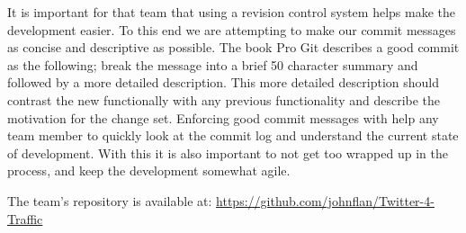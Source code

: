 It is important for that team that using a revision control system helps make the development easier. To this end we are attempting to make our commit messages as concise and descriptive as possible. The book Pro Git\cite{website:pro_git_ch2} describes a good commit as the following; break the message into a brief 50 character summary and followed by a more detailed description. This more detailed description should contrast the new functionally with any previous functionality and describe the motivation for the change set. Enforcing good commit messages with help any team member to quickly look at the commit log and understand the current state of development. With this it is also important to not get too wrapped up in the process, and keep the development somewhat agile.

The team’s repository is available at: \url{https://github.com/johnflan/Twitter-4-Traffic}
